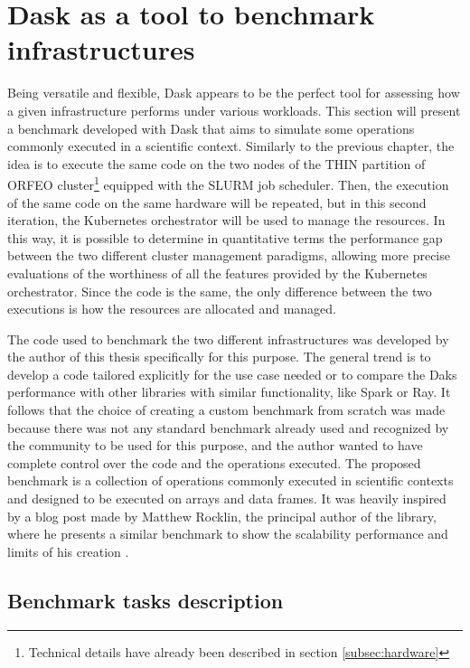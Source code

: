 \section{Dask as a tool to benchmark infrastructures}\label{sec:daskbenchmark}

Being versatile and flexible, Dask appears to be the perfect tool for assessing
how a given infrastructure performs under various workloads.
This section will present a benchmark developed with Dask that aims to simulate
some operations commonly executed in a scientific context.
Similarly to the previous chapter, the idea is to execute the same code on the
two nodes of the THIN partition of ORFEO cluster\footnote{Technical details have
  already been described in section \ref{subsec:hardware}} equipped with the
SLURM job scheduler. Then, the execution of the same code on the same hardware
will be repeated, but in this second iteration, the Kubernetes orchestrator will
be used to manage the resources.
In this way, it is possible to determine in quantitative terms the performance
gap between the two different cluster management paradigms, allowing more
precise evaluations of the worthiness of all the features provided by the
Kubernetes orchestrator.
Since the code is the same, the only difference between the two executions is
how the resources are allocated and managed.

The code used to benchmark the two different infrastructures was developed by
the author of this thesis specifically for this purpose.
The general trend is to develop a code tailored explicitly for the use case
needed or to compare the Daks performance with other libraries with similar
functionality, like Spark or Ray.
It follows that the choice of creating a custom benchmark from scratch was made
because there was not any standard benchmark already used and recognized by the
community to be used for this purpose, and the author wanted to have complete
control over the code and the operations executed.
The proposed benchmark is a collection of operations commonly executed in
scientific contexts and designed to be executed on arrays and data frames.
It was heavily inspired by a blog post made by Matthew Rocklin, the principal
author of the library, where he presents a similar benchmark to show the
scalability performance and limits of his creation \cite{Rocklinblog}.

\subsection{Benchmark tasks description}\label{subsec:benchmarktasks}

